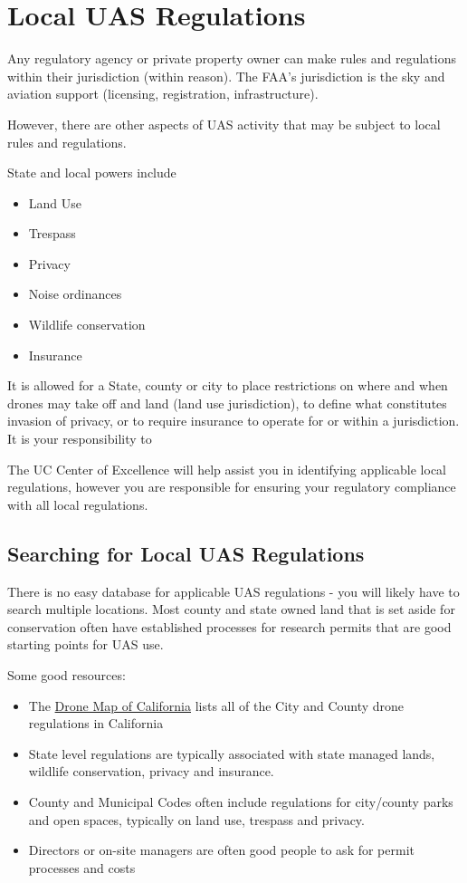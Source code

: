 \documentclass[
  12pt,
]{book}
\providecommand{\tightlist}{%
  \setlength{\itemsep}{0pt}\setlength{\parskip}{0pt}}
\begin{document}
\section{Local UAS Regulations}\label{local-regulations}

Any regulatory agency or private property owner can make rules and regulations within their jurisdiction (within reason). The FAA's jurisdiction is the sky and aviation support (licensing, registration, infrastructure).

However, there are other aspects of UAS activity that may be subject to local rules and regulations.

State and local powers include

\begin{itemize}
\tightlist
\item
  Land Use
\item
  Trespass
\item
  Privacy
\item
  Noise ordinances
\item
  Wildlife conservation
\item
  Insurance
\end{itemize}

It is allowed for a State, county or city to place restrictions on where and when drones may take off and land (land use jurisdiction), to define what constitutes invasion of privacy, or to require insurance to operate for or within a jurisdiction. It is your responsibility to

The UC Center of Excellence will help assist you in identifying applicable local regulations, however you are responsible for ensuring your regulatory compliance with all local regulations.

\subsection{Searching for Local UAS Regulations}\label{searching-for-local-uas-regulations}

There is no easy database for applicable UAS regulations - you will likely have to search multiple locations. Most county and state owned land that is set aside for conservation often have established processes for research permits that are good starting points for UAS use.

Some good resources:

\begin{itemize}
\tightlist
\item
  The \href{https://ucdrones.github.io/map/}{Drone Map of California} lists all of the City and County drone regulations in California
\item
  State level regulations are typically associated with state managed lands, wildlife conservation, privacy and insurance.
\item
  County and Municipal Codes often include regulations for city/county parks and open spaces, typically on land use, trespass and privacy.
\item
  Directors or on-site managers are often good people to ask for permit processes and costs
\end{itemize}
\end{document}
